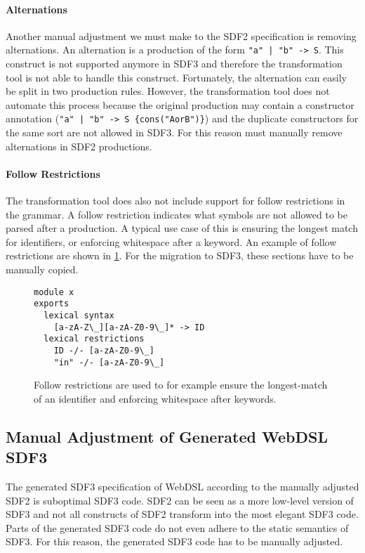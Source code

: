       \paragraph{Alternations} Another manual adjustment we must make to the SDF2 specification is removing alternations. An alternation is a production of the form \texttt{"a" | "b" -> S}. This construct is not supported anymore in SDF3 and therefore the transformation tool is not able to handle this construct. Fortunately, the alternation can easily be split in two production rules. However, the transformation tool does not automate this process because the original production may contain a constructor annotation (\texttt{"a" | "b" -> S \{cons("AorB")\}}) and the duplicate constructors for the same sort are not allowed in SDF3. For this reason must manually remove alternations in SDF2 productions.

      \paragraph{Follow Restrictions} The transformation tool does also not include support for follow restrictions in the grammar. A follow restriction indicates what symbols are not allowed to be parsed after a production. A typical use case of this is ensuring the longest match for identifiers, or enforcing whitespace after a keyword. An example of follow restrictions are shown in \cref{fig:sdf2-follow-restrictions}. For the migration to SDF3, these sections have to be manually copied.

      \begin{figure}
        \begin{verbatim}
module x
exports
  lexical syntax
    [a-zA-Z\_][a-zA-Z0-9\_]* -> ID
  lexical restrictions
    ID -/- [a-zA-Z0-9\_]
    "in" -/- [a-zA-Z0-9\_]
        \end{verbatim}
        \caption{\label{fig:sdf2-follow-restrictions}Follow restrictions are used to for example ensure the longest-match of an identifier and enforcing whitespace after keywords.}
      \end{figure}

    \subsection{\label{subsec:manual-tweaking-sdf3}Manual Adjustment of Generated WebDSL SDF3}

      The generated SDF3 specification of WebDSL according to the manually adjusted SDF2 is suboptimal SDF3 code. SDF2 can be seen as a more low-level version of SDF3 and not all constructs of SDF2 transform into the most elegant SDF3 code. Parts of the generated SDF3 code do not even adhere to the static semantics of SDF3. For this reason, the generated SDF3 code has to be manually adjusted.

